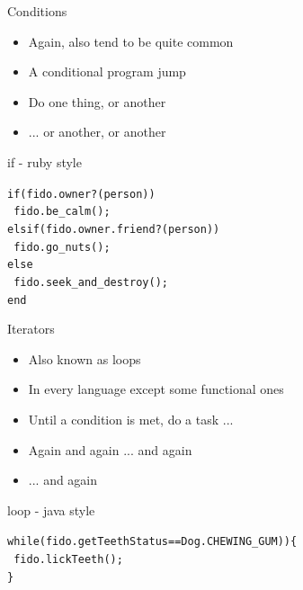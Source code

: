 \documentclass[10pt]{beamer}
\begin{document}
\begin{frame}{Conditions}
  \begin{itemize}
    \item Again, also tend to be quite common
    \item A conditional program jump
    \item Do one thing, or another
    \item ... or another, or another
  \end{itemize}

  \begin{block}{if - ruby style}
    \begin{alltt}
      if (fido.owner?(person)) \\
      ~  fido.be\_calm();         \\
      elsif (fido.owner.friend?(person))\\
      ~  fido.go\_nuts();                  \\
      else                                  \\
      ~  fido.seek\_and\_destroy();            \\
      end                                      \\
    \end{alltt}
  \end{block}
\end{frame}

\begin{frame}{Iterators}
  \begin{itemize}
    \item Also known as loops
    \item In every language except some functional ones
    \item Until a condition is met, do a task ... 
    \item Again and again ... and again
    \item ... and again
  \end{itemize}

  \begin{block}{loop - java style}
    \begin{alltt}
      while(fido.getTeethStatus == Dog.CHEWING\_GUM))\{ \\
      ~  fido.lickTeeth();         \\
      \}\\
    \end{alltt}
  \end{block}
\end{frame}
\end{document}
